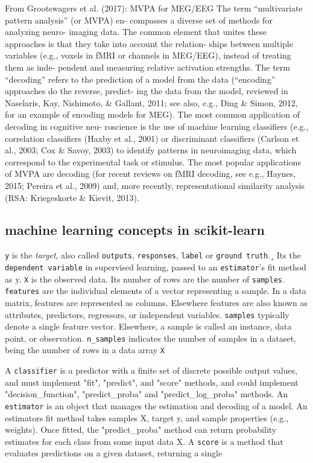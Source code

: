 From Grootswagers et al. (2017): MVPA for MEG/EEG
The term “multivariate pattern analysis” (or MVPA) en-
compasses a diverse set of methods for analyzing neuro-
imaging data. The common element that unites these
approaches is that they take into account the relation-
ships between multiple variables (e.g., voxels in fMRI or
channels in MEG/EEG), instead of treating them as inde-
pendent and measuring relative activation strengths. The
term “decoding” refers to the prediction of a model from
the data (“encoding” approaches do the reverse, predict-
ing the data from the model, reviewed in Naselaris, Kay,
Nishimoto, \& Gallant, 2011; see also, e.g., Ding \& Simon,
2012, for an example of encoding models for MEG). The
most common application of decoding in cognitive neu-
roscience is the use of machine learning classifiers (e.g.,
correlation classifiers (Haxby et al., 2001) or discriminant
classifiers (Carlson et al., 2003; Cox \& Savoy, 2003) to
identify patterns in neuroimaging data, which correspond
to the experimental task or stimulus. The most popular
applications of MVPA are decoding (for recent reviews on
fMRI decoding, see e.g., Haynes, 2015; Pereira et al., 2009)
and, more recently, representational similarity analysis
(RSA: Kriegeskorte \& Kievit, 2013).

\subsection{machine learning concepts in scikit-learn}

\texttt{y} is the \textit{target}, also called \texttt{outputs}, \texttt{responses}, \texttt{label} or \texttt{ground truth}.¸ Its the \texttt{dependent variable} in supervised learning, passed to an \texttt{estimator}'s fit method as y.
\texttt{X} is the observed data. Its number of rows are the number of \texttt{samples}.
\texttt{features} are the individual elements of a vector representing a sample. In a data matrix, features are represented as columns. Elsewhere features are also known as attributes, predictors, regressors, or independent variables.
\texttt{samples} typically denote a single feature vector. Elsewhere, a sample is called an instance, data point, or observation. \texttt{n\_samples} indicates the number of samples in a dataset, being the number of rows in a data array \texttt{X}


A \texttt{classifier} is a predictor with a finite set of discrete possible output values, and must implement "fit", "predict", and "score" methods, and could implement "decision\_function", "predict\_proba" and "predict\_log\_proba" methods.
An \texttt{estimator} is an object that manages the estimation and decoding of a model. An estimators fit method takes samples X, target y, and sample properties (e.g., weights). Once fitted, the "predict\_proba" method can return probability estimates for each class from some input data X. A \texttt{score} is a method that evaluates predictions on a given dataset, returning a single

